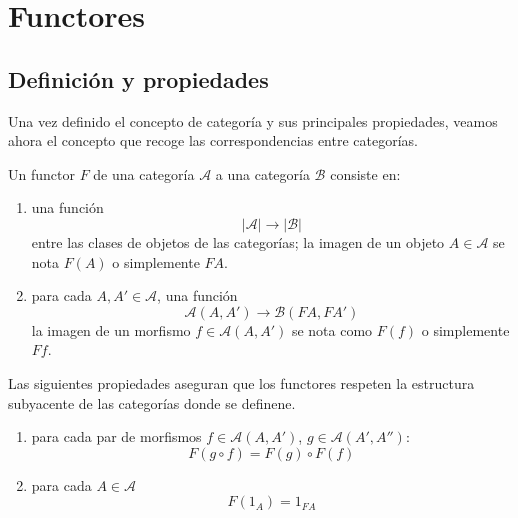 
\section{Functores}
\subsection{Definición y propiedades}
Una vez definido el concepto de categoría y sus principales propiedades, veamos ahora el concepto que recoge las correspondencias entre categorías.

\begin{definicion}
    Un functor $F$ de una categoría $\mathscr{A}$ a una categoría $\mathscr{B}$ consiste en:

    \begin{enumerate}
        \item una función \begin{equation}|\mathscr{A}| \longrightarrow |\mathscr{B}| \end{equation} entre las clases de objetos de las categorías; la imagen de un objeto $A \in \mathscr{A}$ se nota $F(A)$ o simplemente $FA$.

        \item para cada $A, A' \in \mathscr{A}$, una función \begin{equation}\mathscr{A}(A,A') \longrightarrow \mathscr{B}(FA,FA') \end{equation}
        la imagen de un morfismo $f \in \mathscr{A}(A,A')$ se nota como $F(f)$ o simplemente $Ff$.
    \end{enumerate}
    \label{functor}
\end{definicion}

\begin{observacion} Las siguientes propiedades aseguran que los functores respeten la estructura subyacente de las categorías donde se definene.
  \begin{enumerate}
        \item para cada par de morfismos $f \in \mathscr{A}(A,A')$, $g \in          \mathscr{A}(A',A''): $ \begin{equation} F(g \circ f) = F(g) \circ F(f)   \end{equation}

        \item para cada $A \in \mathscr{A}$ \begin{equation}
            F(1_{A}) = 1_{FA}
        \end{equation}
    \end{enumerate}  
\end{observacion}

